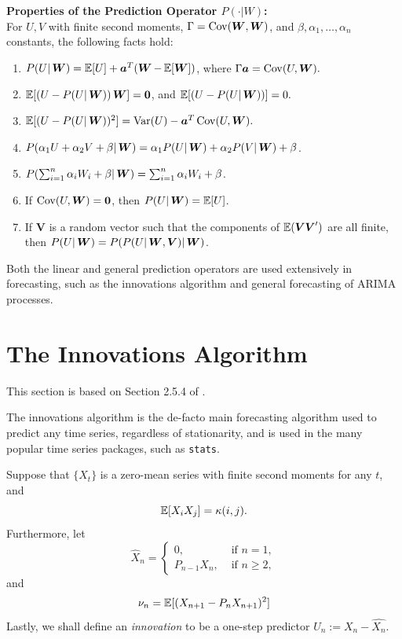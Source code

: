 \documentclass[a4paper, oneside]{discothesis}
\begin{document}
\textbf{Properties of the Prediction Operator $P(\cdot|W)$:} \\
For $U, V$ with finite second moments, $\Gamma = \operatorname{\mathrm{Cov}}(\operatorname{\boldsymbol{W}}, \operatorname{\boldsymbol{W}})$, and $\beta, \alpha_1, \dots, \alpha_n$ constants, the following facts hold:

\begin{enumerate}
    \item $P(U|\operatorname{\boldsymbol{W}}) = \operatorname{\mathbb{E}}[U] + \boldsymbol{a}^T(\operatorname{\boldsymbol{W}} - \operatorname{\mathbb{E}}[\operatorname{\boldsymbol{W}}])$, where $\Gamma \boldsymbol{a} = \operatorname{\mathrm{Cov}}(U, \operatorname{\boldsymbol{W}}).$
    \item $\operatorname{\mathbb{E}}[(U - P(U|\operatorname{\boldsymbol{W}}))\operatorname{\boldsymbol{W}}] = \boldsymbol{0}$, and $\operatorname{\mathbb{E}}[(U - P(U|\operatorname{\boldsymbol{W}}))] = 0.$
    \item $\operatorname{\mathbb{E}}[(U - P(U|\operatorname{\boldsymbol{W}}))^2] = \mathrm{Var}(U) - \boldsymbol{a}^T \operatorname{\mathrm{Cov}}(U, \operatorname{\boldsymbol{W}}).$
    \item $P(\alpha_1 U + \alpha_2 V + \beta | \operatorname{\boldsymbol{W}}) = \alpha_1 P(U|\operatorname{\boldsymbol{W}}) + \alpha_2 P(V|\operatorname{\boldsymbol{W}}) + \beta$.
    \item $P(\sum_{i=1}^n \alpha_i W_i + \beta | \operatorname{\boldsymbol{W}}) = \sum_{i=1}^n \alpha_i W_i + \beta$.
    \item If $\operatorname{\mathrm{Cov}}(U, \operatorname{\boldsymbol{W}}) = \boldsymbol{0}$, then $P(U|\operatorname{\boldsymbol{W}}) = \operatorname{\mathbb{E}}[U]$.
    \item If $\boldsymbol{V}$ is a random vector such that the components of $\operatorname{\mathbb{E}}(\boldsymbol{VV}')$ are all finite, then $P(U|\operatorname{\boldsymbol{W}}) = P(P(U|\operatorname{\boldsymbol{W}}, \boldsymbol{V})|\operatorname{\boldsymbol{W}})$.
\end{enumerate}

Both the linear and general prediction operators are used extensively in forecasting, such as the innovations algorithm and general forecasting of ARIMA processes. 

\section{The Innovations Algorithm} \label{innovations}
This section is based on Section 2.5.4 of \cite{itsf}.

The innovations algorithm is the de-facto main forecasting algorithm used to predict any time series, regardless of stationarity, and is used in the many popular time series packages, such as \texttt{stats}.

Suppose that $\{X_t\}$ is a zero-mean series with finite second moments for any $t$, and 
\begin{equation*}
    \operatorname{\mathbb{E}}[X_iX_j] = \kappa(i,j).
\end{equation*}
Furthermore, let
\begin{equation}
    \label{eq:2.23}\hat{X}_n =
    \begin{cases}
        0, & \text{ if }n = 1, \\
        P_{n-1} X_n, & \text{ if } n \geq 2,
    \end{cases}
\end{equation}
and
\begin{equation*}
    \nu_n = \operatorname{\mathbb{E}}[(X_{n+1} - P_nX_{n+1})^2]
\end{equation*}
Lastly, we shall define an \textit{innovation} to be a one-step predictor $U_n := X_n - \hat{X_n}$.
\end{document}
